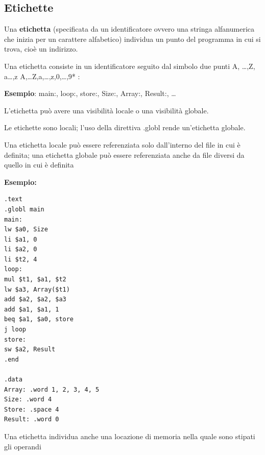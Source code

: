 \documentclass[12pt]{article}
\begin{document}
\subsection{Etichette}
Una \textbf{etichetta} (specificata da un identificatore ovvero una stringa alfanumerica che inizia per un carattere alfabetico) individua un punto del programma in cui si trova, cioè un indirizzo.\par\medskip\noindent
Una etichetta consiste in un identificatore seguito dal simbolo due punti {A, …,Z, a…,z} {A,…Z,a,…,z,0,…,9}* {:} \par\medskip\noindent\textbf{Esempio}: main:, loop:, store:, Size:, Array:, Result:, …\par\medskip\noindent
L’etichetta può avere una visibilità locale o una visibilità globale.\par\medskip\noindent
Le etichette sono locali; l’uso della direttiva .globl rende un’etichetta globale.\par\medskip\noindent
Una etichetta locale può essere referenziata solo dall’interno del file in cui è definita; una etichetta globale può essere referenziata anche da file diversi da quello in cui è definita\par\medskip\noindent
\newpage
\noindent \textbf{Esempio:}
\begin{lstlisting}
.text
.globl main
main:
lw $a0, Size
li $a1, 0
li $a2, 0
li $t2, 4
loop:
mul $t1, $a1, $t2
lw $a3, Array($t1)
add $a2, $a2, $a3
add $a1, $a1, 1
beq $a1, $a0, store
j loop
store:
sw $a2, Result
.end

.data
Array: .word 1, 2, 3, 4, 5
Size: .word 4
Store: .space 4
Result: .word 0
\end{lstlisting}
\vspace{\baselineskip}
Una etichetta individua anche una locazione di memoria nella quale sono stipati gli operandi
\end{document}
